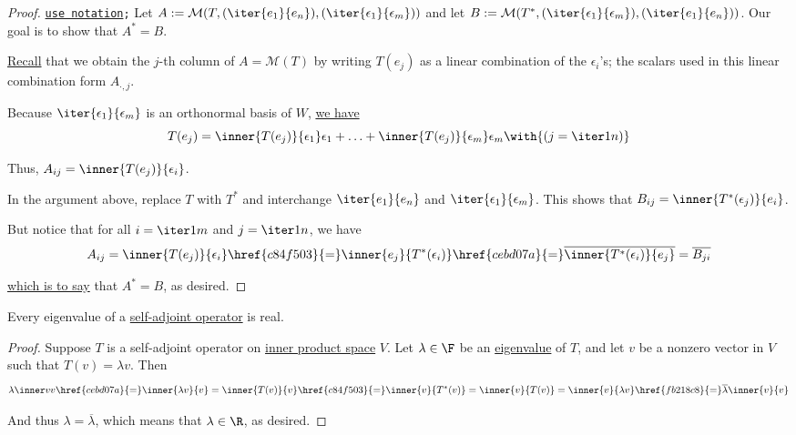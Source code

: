 \begin{proof}
  \def\e{\epsilon}\def\M{\mathcal M}

  \texttt{\href{d76dfe6}{use notation};} Let
  $A:=\M(T,(\iter{e_1}{e_n}),(\iter{\e_1}{\e_m}))$ and let
  $B:=\M(T^*,(\iter{\e_1}{\e_m}),(\iter{e_1}{e_n}))$. Our goal is to show that
  $A^*=B$.

  \href{c70dad0}{Recall} that we obtain the $j$-th column of $A=\M(T)$ by
  writing $T(e_j)$ as a linear combination of the $\e_i$'s; the scalars used in
  this linear combination form $A_{\cdot,j}$.

  Because $\iter{\e_1}{\e_m}$ is an orthonormal basis of $W$, \href{b762d27}{we
  have}
  $$
    T(e_j)=\inner{T(e_j)}{\e_1}\e_1+\ldots+\inner{T(e_j)}{\e_m}\e_m\with{(j=\iter1n)}
  $$

  Thus, $A_{ij}=\inner{T(e_j)}{\e_i}$.

  In the argument above, replace $T$ with $T^*$ and interchange
  $\iter{e_1}{e_n}$ and $\iter{\e_1}{\e_m}$. This shows that
  $B_{ij}=\inner{T^*(\e_j)}{e_i}$.

  But notice that for all $i=\iter1m$ and $j=\iter1n$, we have
  $$
    A_{ij}
    =\inner{T(e_j)}{\e_i}
    \href{c84f503}{=}\inner{e_j}{T^*(\e_i)}
    \href{cebd07a}{=}\overline{\inner{T^*(\e_i)}{e_j}}
    =\overline{B_{ji}}
  $$

  \href{abdc1e4}{which is to say} that $A^*=B$, as desired.
\end{proof}

\label{df532f5}

Every eigenvalue of a \href{d484753}{self-adjoint operator} is real.

\begin{proof}
  Suppose $T$ is a self-adjoint operator on \href{b9935c8}{inner product space}
  $V$. Let $\lambda\in\F$ be an \href{e174ec3}{eigenvalue} of $T$, and let $v$
  be a nonzero vector in $V$ such that $T(v)=\lambda v$. Then
  $$
    \lambda\inner vv
    \href{cebd07a}{=}\inner{\lambda v}{v}
    =\inner{T(v)}{v}
    \href{c84f503}{=}\inner{v}{T^*(v)}
    =\inner{v}{T(v)}
    =\inner{v}{\lambda v}
    \href{fb218c8}{=}\overline\lambda\inner{v}{v}
  $$

  And thus $\lambda=\overline\lambda$, which means that $\lambda\in\R$, as
  desired.
\end{proof}
